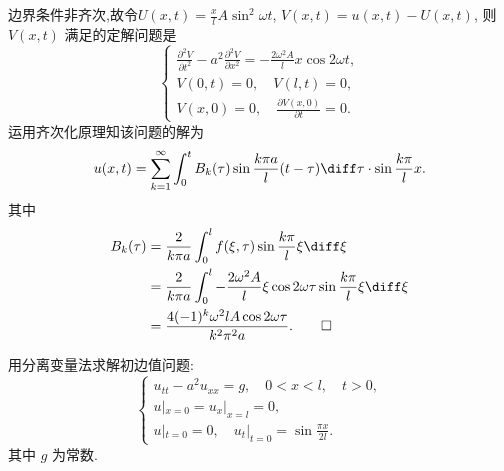 \begin{solve}
  边界条件非齐次,故令$U(x,t)=\frac{x}{l}A\sin^2\omega t$,
  $V(x,t)=u(x,t)-U(x,t)$, 则 $V(x,t)$ 满足的定解问题是
  \[\begin{cases}
    \frac{\partial^2V}{\partial t^2}-a^2\frac{\partial^2V}{\partial x^2}
      = -\frac{2\omega^2A}{l}x\cos 2\omega t, \\
    V(0,t)=0,\quad V(l,t)=0, \\
    V(x,0)=0,\quad \frac{\partial V(x,0)}{\partial t} = 0.
  \end{cases}\]
  运用齐次化原理知该问题的解为
  \[u(x,t)=\sum_{k=1}^{\infty}\int_0^tB_k(\tau)\sin\frac{k\pi a}{l}(t-\tau)\diff\tau
    \cdot\sin\frac{k\pi}{l}x.\]
  其中
  \[\begin{split}
    B_k(\tau)
    & = \frac{2}{k\pi a}\int_0^lf(\xi,\tau)\sin\frac{k\pi}{l}\xi\diff\xi \\
    & = \frac{2}{k\pi a}\int_0^l-\frac{2\omega^2A}{l}\xi\cos2\omega\tau
      \sin\frac{k\pi}{l}\xi\diff\xi \\
    & = \frac{4(-1)^k\omega^2lA\cos2\omega\tau}{k^2\pi^2a}.\qedhere
  \end{split}\]
\end{solve}


\begin{exercise}[4]
  用分离变量法求解初边值问题:
  \[\begin{cases}
    u_{tt} - a^2 u_{xx} = g,\quad 0<x<l,\quad t>0, \\
    u|_{x=0} = u_x|_{x=l} = 0, \\
    u|_{t=0} = 0,\quad u_t|_{t=0} =\sin\frac{\pi x}{2l}.
  \end{cases}\]
  其中 $g$ 为常数.
\end{exercise}

